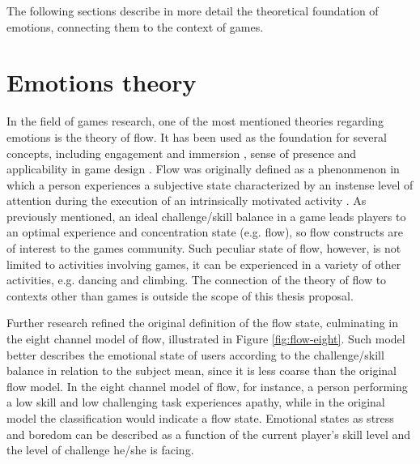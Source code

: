  The following sections describe in more detail the theoretical foundation of emotions, connecting them to the context of games.

\section{Emotions theory}

In the field of games research, one of the most mentioned theories regarding emotions is the theory of flow. It has been used as the foundation for several concepts, including engagement and immersion \parencite{brown2004grounded}, sense of presence \parencite{weibel2011immersion} and applicability in game design \parencite{sweetser2005gameflow, chen2007flow, cruz2017player}. Flow was originally defined as a phenonmenon in which a person experiences a subjective state characterized by an instense level of attention during the execution of an intrinsically motivated activity \parencite{csikszentmihalyi1991flow}. As previously mentioned, an ideal challenge/skill balance in a game leads players to an optimal experience and concentration state (e.g. flow), so flow constructs are of interest to the games community. Such peculiar state of flow, however, is not limited to activities involving games, it can be experienced in a variety of other activities, e.g. dancing and climbing. The connection of the theory of flow to contexts other than games is outside the scope of this thesis proposal.

Further research \parencite{nakamura2014concept} refined the original definition of the flow state, culminating in the eight channel model of flow, illustrated in Figure \ref{fig:flow-eight}. Such model better describes the emotional state of users according to the challenge/skill balance in relation to the subject mean, since it is less coarse than the original flow model. In the eight channel model of flow, for instance, a person performing a low skill and low challenging task experiences apathy, while in the original model the classification would indicate a flow state. Emotional states as stress and boredom can be described as a function of the current player's skill level and the level of challenge he/she is facing.

